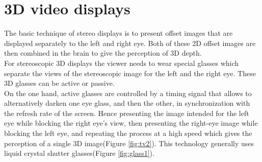 \section{3D video displays}
The basic technique of stereo displays is to present offset images that are displayed separately to the left and right eye. Both of these 2D offset images are then combined in the brain to give the perception of 3D depth.\\
For stereoscopic 3D displays the viewer needs to wear special glasses which separate the views of the stereoscopic image for the left and the right eye. These 3D glasses can be active or passive\cite{3D}\cite{3D2}.\\
On the one hand, active glasses are controlled by a timing signal that allows to alternatively darken one
eye glass, and then the other, in synchronization with the refresh rate of the screen. Hence presenting
the image intended for the left eye while blocking the right eye's view, then presenting the right-eye
image while blocking the left eye, and repeating the process at a high speed which gives the perception
of a single 3D image(Figure \ref{fig:tv2}). This technology generally uses liquid crystal shutter glasses(Figure \ref{fig:glass1}).\\
